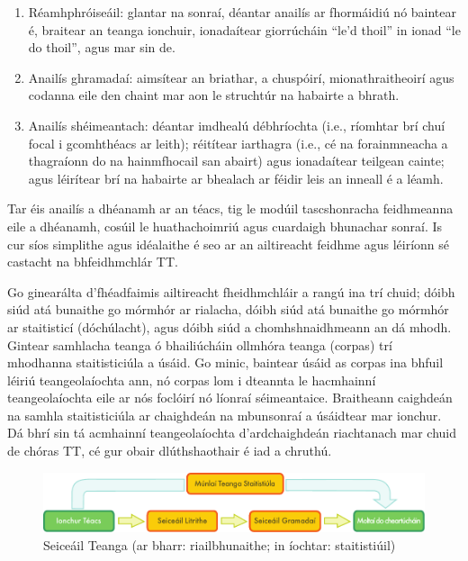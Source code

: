 \begin{multicols}{2}
\begin{enumerate}
\item Réamhphróiseáil: glantar na sonraí, déantar anailís ar fhormáidiú nó baintear é, braitear an teanga ionchuir, ionadaítear giorrúcháin ``le'd thoil'' in ionad ``le do thoil'', agus mar sin de.
\item Anailís ghramadaí: aimsítear an briathar, a chuspóirí, mionathraitheoirí agus codanna eile den chaint mar aon le struchtúr na habairte a bhrath.
\item Anailís shéimeantach: déantar imdhealú débhríochta (i.e., ríomhtar brí chuí focal i gcomhthéacs ar leith); réitítear iarthagra (i.e., cé na forainmneacha a thagraíonn do na hainmfhocail san abairt) agus ionadaítear teilgean cainte; agus léirítear brí na habairte ar bhealach ar féidir leis an inneall é a léamh.
\end{enumerate}

Tar éis anailís a dhéanamh ar an téacs, tig le modúil tascshonracha feidhmeanna eile a dhéanamh, cosúil le huathachoimriú agus cuardaigh bhunachar sonraí. Is cur síos simplithe agus idéalaithe é seo ar an ailtireacht feidhme agus léiríonn sé castacht na bhfeidhmchlár TT.  

Go ginearálta d’fhéadfaimis ailtireacht fheidhmchláir a rangú ina trí chuid; dóibh siúd atá bunaithe go mórmhór ar rialacha, dóibh siúd atá bunaithe go mórmhór ar staitisticí (dóchúlacht), agus dóibh siúd a chomhshnaidhmeann an dá mhodh. Gintear  samhlacha teanga ó bhailiúcháin ollmhóra teanga (corpas) trí mhodhanna staitisticiúla a úsáid. Go minic, baintear úsáid as corpas ina bhfuil léiriú teangeolaíochta ann, nó corpas lom i dteannta le hacmhainní teangeolaíochta eile ar nós foclóirí nó líonraí séimeantaice. Braitheann caighdeán na samhla staitisticiúla ar chaighdeán na mbunsonraí a úsáidtear mar ionchur. Dá bhrí sin tá acmhainní teangeolaíochta d’ardchaighdeán riachtanach mar chuid de chóras TT, cé gur obair dlúthshaothair é iad a chruthú.

\begin{figure}[htb]
  \center
  \includegraphics[width=\textwidth]{../_media/irish/language_checking}
  \caption{Seiceáil Teanga (ar bharr: riailbhunaithe; in íochtar: staitistiúil)}
  \label{fig:langcheckingaarch_de}
\end{figure}


\end{multicols}
